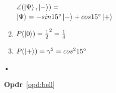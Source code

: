 \documentclass[../../main.tex]{subfiles}
\begin{document}
\begin{flushleft}
\begin{minipage}{.45\textwidth}
\begin{enumerate}
$\angle(\ket{\Psi},\ket{-})=$\\
$\ket{\Psi}= -sin\SI{15}{\degree}\ket{-}+cos\SI{15}{\degree}\ket{+}$\\
\item $P(\ket{0})={\tfrac{1}{2}}^2= \tfrac{1}{4}$
\item $P(\ket{+})=\gamma^2= cos^2 \SI{15}{\degree}$
\end{enumerate}
\begin{center}
•
\end{center}
\end{minipage}
\end{flushleft}

%
\textbf{Opdr}~\ref{opd:bell}
\end{document}
